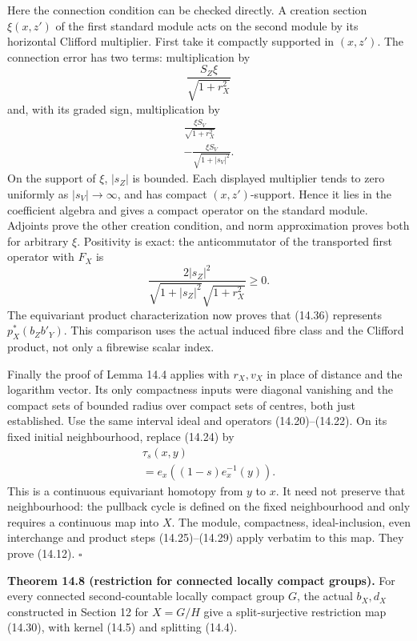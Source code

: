 \documentclass[
  11pt,
]{article}
\begin{document}
Here the connection condition can be checked directly. A creation
section \(\xi(x,z')\) of the first standard module acts on the second
module by its horizontal Clifford multiplier. First take it compactly
supported in \((x,z')\). The connection error has two terms:
multiplication by \[
\frac{S_Z\xi}{\sqrt{1+r_X^2}}
\tag{14.37}
\] and, with its graded sign, multiplication by \[
\begin{gathered}
\frac{\xi S_V}{\sqrt{1+r_X^2}}\\
-\frac{\xi S_V}{\sqrt{1+|s_V|^2}}.
\end{gathered}
\tag{14.38}
\] On the support of \(\xi\), \(|s_Z|\) is bounded. Each displayed
multiplier tends to zero uniformly as \(|s_V|\to\infty\), and has
compact \((x,z')\)-support. Hence it lies in the coefficient algebra and
gives a compact operator on the standard module. Adjoints prove the
other creation condition, and norm approximation proves both for
arbitrary \(\xi\). Positivity is exact: the anticommutator of the
transported first operator with \(F_X\) is \[
\frac{2|s_Z|^2}
 {\sqrt{1+|s_Z|^2}\sqrt{1+r_X^2}}\geq0.
\tag{14.39}
\] The equivariant product characterization now proves that (14.36)
represents \(p_X^*(b_Zb'_Y)\). This comparison uses the actual induced
fibre class and the Clifford product, not only a fibrewise scalar index.

Finally the proof of Lemma 14.4 applies with \(r_X,v_X\) in place of
distance and the logarithm vector. Its only compactness inputs were
diagonal vanishing and the compact sets of bounded radius over compact
sets of centres, both just established. Use the same interval ideal and
operators (14.20)--(14.22). On its fixed initial neighbourhood, replace
(14.24) by \[
\begin{gathered}
\tau_s(x,y)\\
=e_x((1-s)e_x^{-1}(y)).
\end{gathered}
\tag{14.40}
\] This is a continuous equivariant homotopy from \(y\) to \(x\). It
need not preserve that neighbourhood: the pullback cycle is defined on
the fixed neighbourhood and only requires a continuous map into \(X\).
The module, compactness, ideal-inclusion, even interchange and product
steps (14.25)--(14.29) apply verbatim to this map. They prove (14.12).
\(\square\)

\textbf{Theorem 14.8 (restriction for connected locally compact
groups).} For every connected second-countable locally compact group
\(G\), the actual \(b_X,d_X\) constructed in Section 12 for \(X=G/H\)
give a split-surjective restriction map (14.30), with kernel (14.5) and
splitting (14.4).
\end{document}

